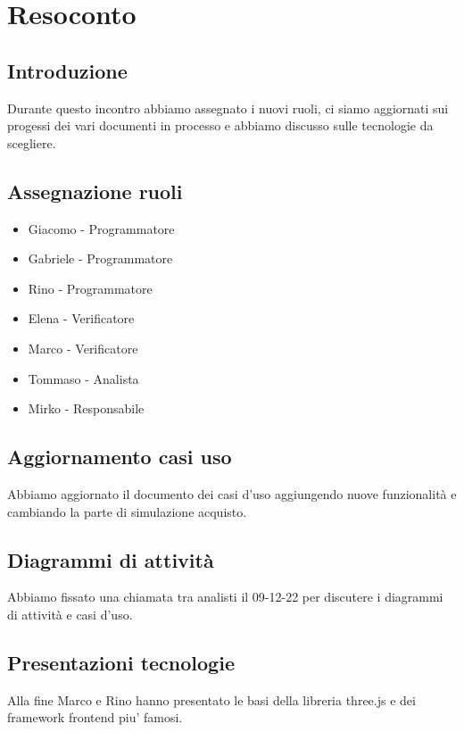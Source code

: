 \section{Resoconto}
\subsection{Introduzione}
Durante questo incontro abbiamo assegnato i nuovi ruoli, ci siamo aggiornati sui progessi dei vari documenti in processo e abbiamo discusso sulle tecnologie da scegliere.

\subsection{Assegnazione ruoli}
\begin{itemize}
	\item Giacomo - Programmatore
	\item Gabriele - Programmatore 
	\item Rino - Programmatore
	\item Elena - Verificatore
	\item Marco - Verificatore
	\item Tommaso - Analista
	\item Mirko - Responsabile
\end{itemize}

\subsection{Aggiornamento casi uso}
Abbiamo aggiornato il documento dei casi d'uso aggiungendo nuove funzionalità e cambiando la parte di simulazione acquisto.

\subsection{Diagrammi di attività}
Abbiamo fissato una chiamata tra analisti il 09-12-22 per discutere i diagrammi di attività  e casi d’uso.

\subsection{Presentazioni tecnologie}
Alla fine Marco e Rino hanno presentato le basi della libreria three.js e dei framework frontend piu' famosi.

